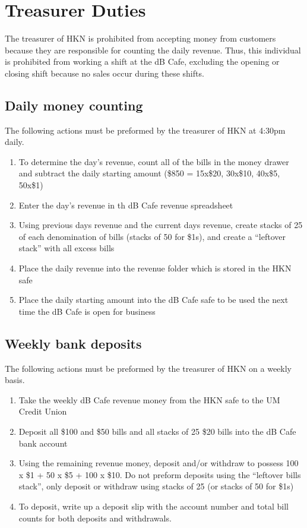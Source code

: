 \documentclass[12pt,onecolumn,letterpaper]{article}
\begin{document}
\section{Treasurer Duties}
The treasurer of HKN is prohibited from accepting money from customers because they are responsible for counting the daily revenue. Thus, this individual is prohibited from working a shift at the dB Cafe, excluding the opening or closing shift because no sales occur during these shifts.
\subsection{Daily money counting}
The following actions must be preformed by the treasurer of HKN at 4:30pm daily. 
\begin{enumerate}
\item To determine the day's revenue, count all of the bills in the money drawer and subtract the daily starting amount (\$850 = 15x\$20, 30x\$10, 40x\$5, 50x\$1)
\item Enter the day's revenue in th dB Cafe revenue spreadsheet 
\item Using previous days revenue and the current days revenue, create stacks of 25 of each denomination of bills (stacks of 50 for \$1s), and create a ``leftover stack'' with all excess bills 
\item Place the daily revenue into the revenue folder which is stored in the HKN safe
\item Place the daily starting amount into the dB Cafe safe to be used the next time the dB Cafe is open for business
\end{enumerate}
\subsection{Weekly bank deposits}
The following actions must be preformed by the treasurer of HKN on a weekly basis.
\begin{enumerate}
\item Take the weekly dB Cafe revenue money from the HKN safe to the UM Credit Union
\item Deposit all \$100 and \$50 bills and all stacks of 25 \$20 bills into the dB Cafe bank account
\item Using the remaining revenue money, deposit and/or withdraw to possess 100 x \$1 + 50 x \$5 + 100 x \$10. Do not preform deposits using the ``leftover bills stack'', only deposit or withdraw using stacks of 25 (or stacks of 50 for \$1s)
\item To deposit, write up a deposit slip with the account number and total bill counts for both deposits and withdrawals.
\end{enumerate}
\end{document}
